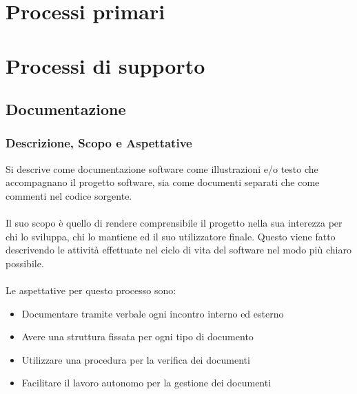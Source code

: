 \documentclass{article}
\begin{document}
\section{Processi primari}


\section{Processi di supporto}

\subsection{Documentazione}
\subsubsection{Descrizione, Scopo e Aspettative }
Si descrive come documentazione software come illustrazioni e/o testo che accompagnano il progetto software, sia come documenti separati che come commenti nel codice sorgente.\\ \\
Il suo scopo è quello di rendere comprensibile il progetto nella sua interezza per chi lo sviluppa, chi lo mantiene ed il suo utilizzatore finale. Questo viene fatto descrivendo le attività effettuate nel ciclo di vita del software nel modo più chiaro possibile.\\ \\
Le aspettative per questo processo sono:
\begin{itemize}
    \item Documentare tramite verbale ogni incontro interno ed esterno
    \item Avere una struttura fissata per ogni tipo di documento
    \item Utilizzare una procedura per la verifica dei documenti
    \item Facilitare il lavoro autonomo per la gestione dei documenti
\end{itemize}
\end{document}
